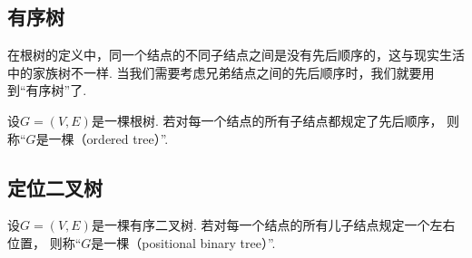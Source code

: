 \subsection{有序树}
在根树的定义中，同一个结点的不同子结点之间是没有先后顺序的，这与现实生活中的家族树不一样.
当我们需要考虑兄弟结点之间的先后顺序时，我们就要用到“有序树”了.
\begin{definition}
设\(G = (V,E)\)是一棵根树.
若对每一个结点的所有子结点都规定了先后顺序，
则称“\(G\)是一棵（ordered tree）”.
\end{definition}

\subsection{定位二叉树}
\begin{definition}
设\(G = (V,E)\)是一棵有序二叉树.
若对每一个结点的所有儿子结点规定一个左右位置，
则称“\(G\)是一棵（positional binary tree）”.
\end{definition}
